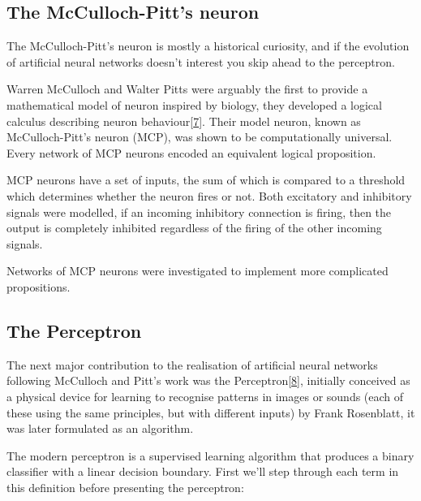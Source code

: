 \documentclass[A4paper,draft]{scrreprt}
\begin{document}
\subsection{The McCulloch-Pitt's
neuron}\label{the-mcculloch-pitts-neuron}

The McCulloch-Pitt's neuron is mostly a historical curiosity, and if the
evolution of artificial neural networks doesn't interest you skip ahead
to the perceptron.

Warren McCulloch and Walter Pitts were arguably the first to provide a
mathematical model of neuron inspired by biology, they developed a
logical calculus describing neuron
behaviour{[}\protect\hyperlink{ref-mcculloch1943_logicalcalculusideas}{7}{]}.
Their model neuron, known as McCulloch-Pitt's neuron (MCP), was shown to
be computationally universal. Every network of MCP neurons encoded an
equivalent logical proposition.

MCP neurons have a set of inputs, the sum of which is compared to a
threshold which determines whether the neuron fires or not. Both
excitatory and inhibitory signals were modelled, if an incoming
inhibitory connection is firing, then the output is completely inhibited
regardless of the firing of the other incoming signals.

Networks of MCP neurons were investigated to implement more complicated
propositions.

\subsection{The Perceptron}\label{the-perceptron}

The next major contribution to the realisation of artificial neural
networks following McCulloch and Pitt's work was the
Perceptron{[}\protect\hyperlink{ref-rosenblatt1957_Perceptronperceivingrecognising}{8}{]},
initially conceived as a physical device for learning to recognise
patterns in images or sounds (each of these using the same principles,
but with different inputs) by Frank Rosenblatt, it was later formulated
as an algorithm.

The modern perceptron is a supervised learning algorithm that produces a
binary classifier with a linear decision boundary. First we'll step
through each term in this definition before presenting the perceptron:
\end{document}
